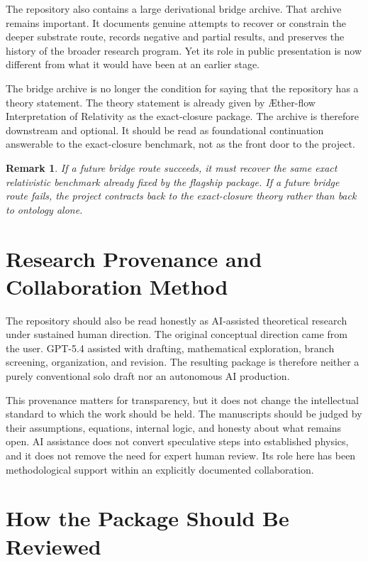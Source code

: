 \documentclass[11pt]{article}
\newcommand{\Aflow}{\AE{}ther-flow}
\newcommand{\TheoryName}{\Aflow{} Interpretation of Relativity}
\newtheorem{remark}{Remark}
\begin{document}
The repository also contains a large derivational bridge archive. That archive remains important. It documents genuine attempts to recover or constrain the deeper substrate route, records negative and partial results, and preserves the history of the broader research program. Yet its role in public presentation is now different from what it would have been at an earlier stage.

The bridge archive is no longer the condition for saying that the repository has a theory statement. The theory statement is already given by \TheoryName{} as the exact-closure package. The archive is therefore downstream and optional. It should be read as foundational continuation answerable to the exact-closure benchmark, not as the front door to the project.

\begin{remark}
If a future bridge route succeeds, it must recover the same exact relativistic benchmark already fixed by the flagship package. If a future bridge route fails, the project contracts back to the exact-closure theory rather than back to ontology alone.
\end{remark}

\section{Research Provenance and Collaboration Method}

The repository should also be read honestly as AI-assisted theoretical research under sustained human direction. The original conceptual direction came from the user. GPT-5.4 assisted with drafting, mathematical exploration, branch screening, organization, and revision. The resulting package is therefore neither a purely conventional solo draft nor an autonomous AI production.

This provenance matters for transparency, but it does not change the intellectual standard to which the work should be held. The manuscripts should be judged by their assumptions, equations, internal logic, and honesty about what remains open. AI assistance does not convert speculative steps into established physics, and it does not remove the need for expert human review. Its role here has been methodological support within an explicitly documented collaboration.

\section{How the Package Should Be Reviewed}
\end{document}
